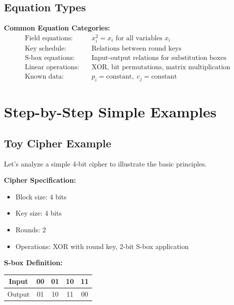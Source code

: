 \documentclass[12pt,a4paper]{article}
\begin{document}
\subsection{Equation Types}

\begin{mathematicsbox}
\textbf{Common Equation Categories:}
\begin{align}
\text{Field equations:} \quad & x_i^2 = x_i \text{ for all variables } x_i \\
\text{Key schedule:} \quad & \text{Relations between round keys} \\
\text{S-box equations:} \quad & \text{Input-output relations for substitution boxes} \\
\text{Linear operations:} \quad & \text{XOR, bit permutations, matrix multiplication} \\
\text{Known data:} \quad & p_i = \text{constant}, \; c_j = \text{constant}
\end{align}
\end{mathematicsbox}

\section{Step-by-Step Simple Examples}

\subsection{Toy Cipher Example}

Let's analyze a simple 4-bit cipher to illustrate the basic principles.

\begin{examplebox}[title=4-bit Toy Cipher]
\textbf{Cipher Specification:}
\begin{itemize}
    \item Block size: 4 bits
    \item Key size: 4 bits
    \item Rounds: 2
    \item Operations: XOR with round key, 2-bit S-box application
\end{itemize}

\textbf{S-box Definition:}
\begin{center}
\begin{tabular}{c|cccc}
Input & 00 & 01 & 10 & 11 \\
\hline
Output & 01 & 10 & 11 & 00 \\
\end{tabular}
\end{center}
\end{examplebox}
\end{document}
